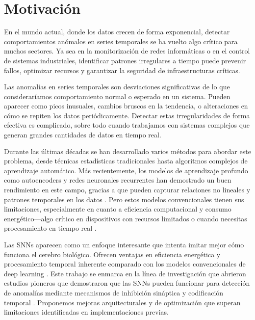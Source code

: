 \section{Motivación}

En el mundo actual, donde los datos crecen de forma exponencial, detectar comportamientos anómalos en series temporales se ha vuelto algo crítico para muchos sectores. Ya sea en la monitorización de redes informáticas o en el control de sistemas industriales, identificar patrones irregulares a tiempo puede prevenir fallos, optimizar recursos y garantizar la seguridad de infraestructuras críticas.

Las anomalías en series temporales son desviaciones significativas de lo que consideraríamos comportamiento normal o esperado en un sistema. Pueden aparecer como picos inusuales, cambios bruscos en la tendencia, o alteraciones en cómo se repiten los datos periódicamente. Detectar estas irregularidades de forma efectiva es complicado, sobre todo cuando trabajamos con sistemas complejos que generan grandes cantidades de datos en tiempo real. 

Durante las últimas décadas se han desarrollado varios métodos para abordar este problema, desde técnicas estadísticas tradicionales hasta algoritmos complejos de aprendizaje automático. Más recientemente, los modelos de aprendizaje profundo como autoencoders y redes neuronales recurrentes han demostrado un buen rendimiento en este campo, gracias a que pueden capturar relaciones no lineales y patrones temporales en los datos \cite{cherdo_time_2023,kshirasagar_auditory_2024}. Pero estos modelos convencionales tienen sus limitaciones, especialmente en cuanto a eficiencia computacional y consumo energético—algo crítico en dispositivos con recursos limitados o cuando necesitas procesamiento en tiempo real \cite{kshirasagar_auditory_2024,plummer_2d_2025}. 

Las SNNs aparecen como un enfoque interesante que intenta imitar mejor cómo funciona el cerebro biológico. Ofrecen ventajas en eficiencia energética y procesamiento temporal inherente comparado con los modelos convencionales de deep learning \cite{lv_efficient_2024,yusob_anomaly_2018,basler_unsupervised_2022}. Este trabajo se enmarca en la línea de investigación que abrieron estudios pioneros que demostraron que las SNNs pueden funcionar para detección de anomalías mediante mecanismos de inhibición sináptica y codificación temporal \cite{cherdo_time_2023,yusob_anomaly_2018,basler_unsupervised_2022}. Proponemos mejoras arquitecturales y de optimización que superan limitaciones identificadas en implementaciones previas. 

